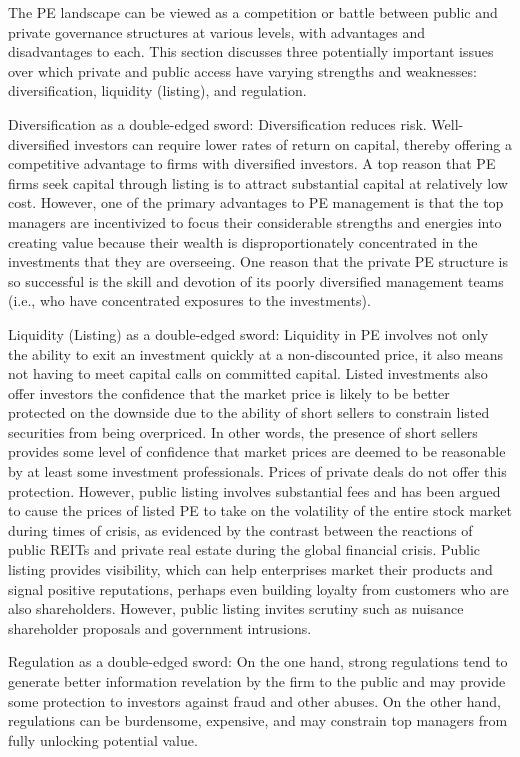 \documentclass[11pt]{article}
\begin{document}
The PE landscape can be viewed as a competition or battle between public and private governance structures at various levels, with advantages and disadvantages to each. This section discusses three potentially important issues over which private and public access have varying strengths and weaknesses: diversification, liquidity (listing), and regulation.

Diversification as a double-edged sword: Diversification reduces risk. Well-diversified investors can require lower rates of return on capital, thereby offering a competitive advantage to firms with diversified investors. A top reason that PE firms seek capital through listing is to attract substantial capital at relatively low cost. However, one of the primary advantages to PE management is that the top managers are incentivized to focus their considerable strengths and energies into creating value because their wealth is disproportionately concentrated in the investments that they are overseeing. One reason that the private PE structure is so successful is the skill and devotion of its poorly diversified management teams (i.e., who have concentrated exposures to the investments).

Liquidity (Listing) as a double-edged sword: Liquidity in PE involves not only the ability to exit an investment quickly at a non-discounted price, it also means not having to meet capital calls on committed capital. Listed investments also offer investors the confidence that the market price is likely to be better protected on the downside due to the ability of short sellers to constrain listed securities from being overpriced. In other words, the presence of short sellers provides some level of confidence that market prices are deemed to be reasonable by at least some investment professionals. Prices of private deals do not offer this protection. However, public listing involves substantial fees and has been argued to cause the prices of listed PE to take on the volatility of the entire stock market during times of crisis, as evidenced by the contrast between the reactions of public REITs and private real estate during the global financial crisis. Public listing provides visibility, which can help enterprises market their products and signal positive reputations, perhaps even building loyalty from customers who are also shareholders. However, public listing invites scrutiny such as nuisance shareholder proposals and government intrusions.

Regulation as a double-edged sword: On the one hand, strong regulations tend to generate better information revelation by the firm to the public and may provide some protection to investors against fraud and other abuses. On the other hand, regulations can be burdensome, expensive, and may constrain top managers from fully unlocking potential value.
\end{document}
